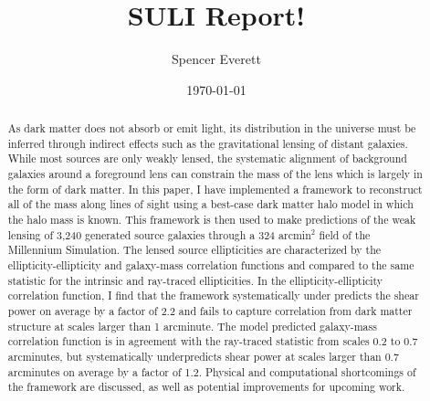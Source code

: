 \documentclass[%
 reprint,
 amsmath,amssymb,
 aps,nofootinbib
]{revtex4-1}
\begin{document}

\title{SULI Report!}

\author{Spencer Everett}


\date{\today}

\begin{abstract}
As dark matter does not absorb or emit light, its distribution in the universe must be inferred through indirect effects such as the gravitational lensing of distant galaxies. While most sources are only weakly lensed, the systematic alignment of background galaxies around a foreground lens can constrain the mass of the lens which is largely in the form of dark matter. In this paper, I have implemented a framework to reconstruct all of the mass along lines of sight using a  best-case dark matter halo model in which the halo mass is known. This framework is then used to make predictions of the weak lensing of 3,240 generated source galaxies through a 324 arcmin$^2$ field of the Millennium Simulation. The lensed source ellipticities are characterized by the ellipticity-ellipticity and galaxy-mass correlation functions and compared to the same statistic for the intrinsic and ray-traced ellipticities. In the ellipticity-ellipticity correlation function, I find that the framework systematically under predicts the shear power on average by a factor of 2.2 and fails to capture correlation from dark matter structure at scales larger than 1 arcminute. The model predicted galaxy-mass correlation function is in agreement with the ray-traced statistic from scales 0.2 to 0.7 arcminutes, but systematically underpredicts shear power at scales larger than 0.7 arcminutes on average by a factor of 1.2. Physical and computational shortcomings of the framework are discussed, as well as potential improvements for upcoming work.
\end{abstract}

\maketitle
\end{document}
